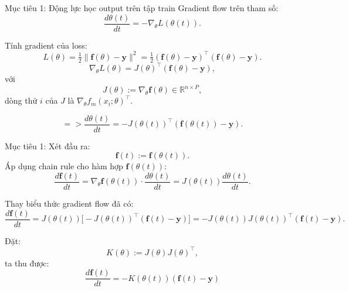 \documentclass[12pt]{beamer}
\begin{document}
\begin{frame}{Mục tiêu 1: Động lực học output trên tập train}
  Gradient flow trên tham số:
  \[
    \frac{d\theta(t)}{dt}
    = -\nabla_\theta L(\theta(t)).
  \]

  Tính gradient của loss:
  \[
    L(\theta) = \tfrac12\|\mathbf f(\theta) - \mathbf y\|^2
    = \tfrac12 (\mathbf f(\theta) - \mathbf y)^\top (\mathbf f(\theta) - \mathbf y).
  \]
  \[
    \nabla_\theta L(\theta)
    = J(\theta)^\top (\mathbf f(\theta) - \mathbf y),
  \]
  với
  \[
    J(\theta) := \nabla_\theta \mathbf f(\theta)
    \in\mathbb R^{n\times P},
  \]
  dòng thứ $i$ của $J$ là $\nabla_\theta f_m(x_i;\theta)^\top$.

  \[
    => \frac{d\theta(t)}{dt}
    = -J(\theta(t))^\top(\mathbf f(\theta(t)) - \mathbf y).
  \]
\end{frame}

\begin{frame}{Mục tiêu 1:}
  Xét đầu ra:
  \[
    \mathbf f(t) := \mathbf f(\theta(t)).
  \]
  Áp dụng chain rule cho hàm hợp $\mathbf f(\theta(t))$:
  \[
    \frac{d\mathbf f(t)}{dt}
    = \nabla_\theta \mathbf f(\theta(t))\cdot \frac{d\theta(t)}{dt}
    = J(\theta(t)) \frac{d\theta(t)}{dt}.
  \]

  Thay biểu thức gradient flow đã có:
  \[
    \frac{d\mathbf f(t)}{dt}
    = J(\theta(t))\big[-J(\theta(t))^\top(\mathbf f(t) - \mathbf y)\big]
    = -J(\theta(t))J(\theta(t))^\top(\mathbf f(t) - \mathbf y).
  \]

  Đặt:
  \[
    K(\theta) := J(\theta)J(\theta)^\top,
  \]
  ta thu được:
  \[
    \boxed{
      \frac{d\mathbf f(t)}{dt}
      = -K(\theta(t))(\mathbf f(t) - \mathbf y)
    }
  \]

\end{frame}
\end{document}
